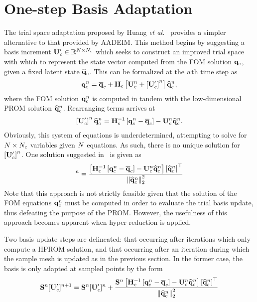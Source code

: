 \section{One-step Basis Adaptation}
%
The trial space adaptation proposed by Huang \textit{et al.}~\cite{Huang2022a} provides a simpler alternative to that provided by AADEIM. This method begins by suggesting a basis increment $\consTrialUpdate \inRTwo{\numDOF}{\numConsModes}$ which seeks to construct an improved trial space with which to represent the state vector computed from the FOM solution $\mathbf{q}_{c}$, given a fixed latent state $\mathbf{\widehat{q}}_{c}$. This can be formalized at the $n$th time step as
%
\begin{eqnarray}
	\consVec^{\timeIdx} = \consVecCent + \consScale \left[\consTrial^{\timeIdx} + \left[\consTrialUpdate\right]^{\timeIdx} \right] \consVecCoef^{\timeIdx},
\end{eqnarray}
%
where the FOM solution $\mathbf{q}_{c}^{n}$ is computed in tandem with the low-dimensional PROM solution $\mathbf{\widehat{q}}_{c}^{n}$. Rearranging terms arrives at
%
\begin{eqnarray}
	\left[\consTrialUpdate\right]^{\timeIdx} \consVecCoef^{\timeIdx} = \consScaleInv \left[\consVec^{\timeIdx} - \consVecCent\right] - \consTrial^{\timeIdx} \consVecCoef^{\timeIdx}.
\end{eqnarray}
%
Obviously, this system of equations is underdetermined, attempting to solve for $N \times N_c$ variables given $N$ equations. As such, there is no unique solution for $\left[\consTrialUpdate\right]^{\timeIdx}$. One solution suggested in~\cite{Huang2022a} is given as
%
\begin{equation}
	[\consTrialUpdate]^{\timeIdx} = \frac{\left[\consScaleInv\left[\consVec^{\timeIdx} - \consVecCent\right] - \consTrial^{\timeIdx} \consVecCoef^{\timeIdx}\right]\left[\consVecCoef^{\timeIdx}\right]^\top}{\left\Vert \consVecCoef^{\timeIdx} \right\Vert^2_2}
\end{equation}
%
Note that this approach is not strictly feasible given that the solution of the FOM equations $\mathbf{q}_{c}^{n}$ must be computed in order to evaluate the trial basis update, thus defeating the purpose of the PROM. However, the usefulness of this approach becomes apparent when hyper-reduction is applied.

Two basis update steps are delineated: that occurring after iterations which only compute a HPROM solution, and that occurring after an iteration during which the sample mesh is updated as in the previous section. In the former case, the basis is only adapted at sampled points by the form
%
\begin{equation}
	\sampMat^{\timeIdx} [\consTrialUpdate]^{\timeIdx+1} = \sampMat^{\timeIdx} [\consTrialUpdate]^{\timeIdx} + \frac{\sampMat^{\timeIdx} \left[\consScaleInv\left[\consVec^{\timeIdx} - \consVecCent\right] - \consTrial^{\timeIdx} \consVecCoef^{\timeIdx}\right]\left[\consVecCoef^{\timeIdx}\right]^\top}{\left\Vert \consVecCoef^{\timeIdx} \right\Vert^2_2}
\end{equation}
%

